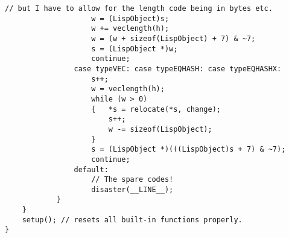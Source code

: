 {\begin{verbatim}
// but I have to allow for the length code being in bytes etc.
                    w = (LispObject)s;
                    w += veclength(h);
                    w = (w + sizeof(LispObject) + 7) & ~7;
                    s = (LispObject *)w;
                    continue;
                case typeVEC: case typeEQHASH: case typeEQHASHX:
                    s++;
                    w = veclength(h);
                    while (w > 0)
                    {   *s = relocate(*s, change);
                        s++;
                        w -= sizeof(LispObject);
                    }
                    s = (LispObject *)(((LispObject)s + 7) & ~7);
                    continue;
                default:
                    // The spare codes!
                    disaster(__LINE__);
            }
    }
    setup(); // resets all built-in functions properly.
}

\end{verbatim}}
